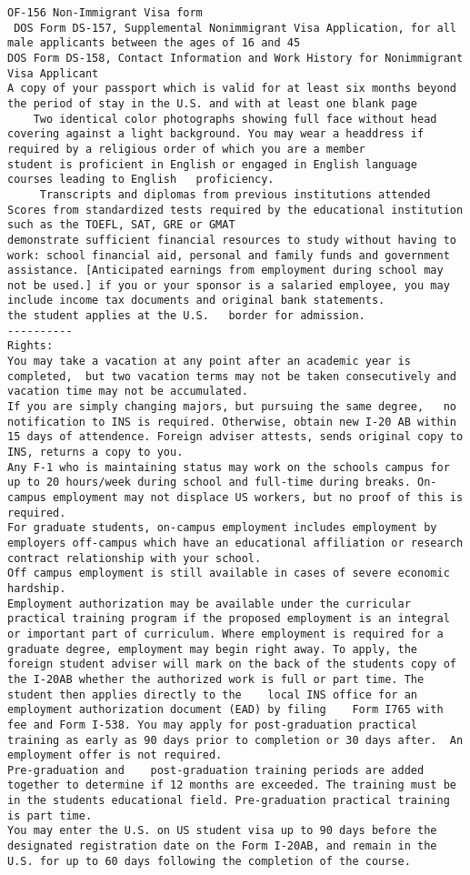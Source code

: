 \documentclass[oneside, article]{memoir}
\begin{document}
\begin{verbatim}
OF-156 Non-Immigrant Visa form
 DOS Form DS-157, Supplemental Nonimmigrant Visa Application, for all male applicants between the ages of 16 and 45
DOS Form DS-158, Contact Information and Work History for Nonimmigrant Visa Applicant
A copy of your passport which is valid for at least six months beyond the period of stay in the U.S. and with at least one blank page
    Two identical color photographs showing full face without head covering against a light background. You may wear a headdress if required by a religious order of which you are a member
student is proficient in English or engaged in English language courses leading to English   proficiency. 
     Transcripts and diplomas from previous institutions attended
Scores from standardized tests required by the educational institution such as the TOEFL, SAT, GRE or GMAT
demonstrate sufficient financial resources to study without having to work: school financial aid, personal and family funds and government assistance. [Anticipated earnings from employment during school may not be used.] if you or your sponsor is a salaried employee, you may include income tax documents and original bank statements.
the student applies at the U.S.   border for admission.
----------
Rights:
You may take a vacation at any point after an academic year is completed,  but two vacation terms may not be taken consecutively and vacation time may not be accumulated.
If you are simply changing majors, but pursuing the same degree,   no notification to INS is required. Otherwise, obtain new I-20 AB within 15 days of attendence. Foreign adviser attests, sends original copy to INS, returns a copy to you.
Any F-1 who is maintaining status may work on the schools campus for up to 20 hours/week during school and full-time during breaks. On-campus employment may not displace US workers, but no proof of this is required.
For graduate students, on-campus employment includes employment by employers off-campus which have an educational affiliation or research contract relationship with your school.
Off campus employment is still available in cases of severe economic hardship.
Employment authorization may be available under the curricular practical training program if the proposed employment is an integral or important part of curriculum. Where employment is required for a graduate degree, employment may begin right away. To apply, the foreign student adviser will mark on the back of the students copy of the I-20AB whether the authorized work is full or part time. The student then applies directly to the    local INS office for an employment authorization document (EAD) by filing    Form I765 with fee and Form I-538. You may apply for post-graduation practical training as early as 90 days prior to completion or 30 days after.  An employment offer is not required.
Pre-graduation and    post-graduation training periods are added together to determine if 12 months are exceeded. The training must be in the students educational field. Pre-graduation practical training is part time.
You may enter the U.S. on US student visa up to 90 days before the designated registration date on the Form I-20AB, and remain in the U.S. for up to 60 days following the completion of the course.


\end{verbatim}
\end{document}
